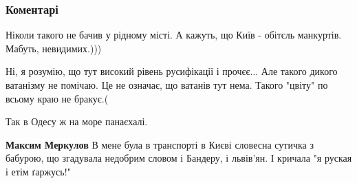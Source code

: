  
 
 
 
 
\subsubsection{Коментарі}

\begin{itemize}
 
Ніколи такого не бачив у рідному місті. А кажуть, що Київ - обітєль манкуртів. Мабуть, невидимих.)))
\begin{itemize}
 
Ні, я розумію, що тут високий рівень русифікації і прочєє... Але такого дикого
ватанізму не помічаю. Це не означає, що ватанів тут нема. Такого "цвіту" по
всьому краю не бракує.(

 
Так в Одесу ж на море панаєхалі.

 
\textbf{Максим Меркулов} В мене була в транспорті в Києві словесна сутичка з бабурою, що згадувала недобрим словом і Бандеру, і львів'ян. І кричала "я руская і етім ґаржусь!"
\end{itemize}


\end{itemize}
